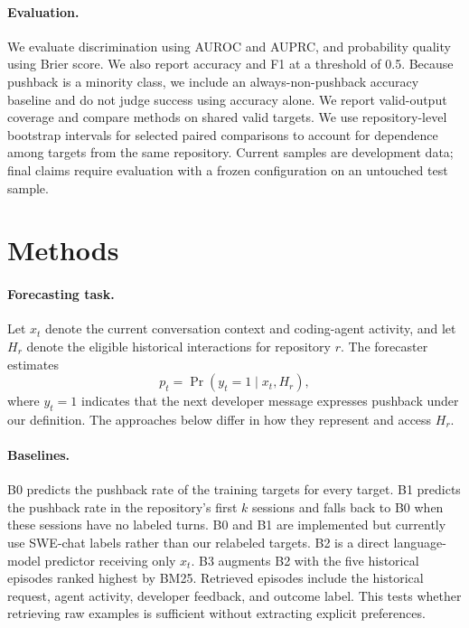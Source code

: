 \documentclass{article} %
\begin{document}
\paragraph{Evaluation.}
We evaluate discrimination using AUROC and AUPRC, and probability quality using Brier score. We also report accuracy and F1 at a threshold of 0.5. Because pushback is a minority class, we include an always-non-pushback accuracy baseline and do not judge success using accuracy alone. We report valid-output coverage and compare methods on shared valid targets. We use repository-level bootstrap intervals for selected paired comparisons to account for dependence among targets from the same repository. Current samples are development data; final claims require evaluation with a frozen configuration on an untouched test sample.

\section{Methods}

\paragraph{Forecasting task.}
Let $x_t$ denote the current conversation context and coding-agent activity, and let $H_r$ denote the eligible historical interactions for repository $r$. The forecaster estimates
\begin{equation}
p_t = \Pr(y_t = 1 \mid x_t, H_r),
\end{equation}
where $y_t=1$ indicates that the next developer message expresses pushback under our definition. The approaches below differ in how they represent and access $H_r$.

\paragraph{Baselines.}
B0 predicts the pushback rate of the training targets for every target. B1 predicts the pushback rate in the repository's first $k$ sessions and falls back to B0 when these sessions have no labeled turns. B0 and B1 are implemented but currently use SWE-chat labels rather than our relabeled targets. B2 is a direct language-model predictor receiving only $x_t$. B3 augments B2 with the five historical episodes ranked highest by BM25. Retrieved episodes include the historical request, agent activity, developer feedback, and outcome label. This tests whether retrieving raw examples is sufficient without extracting explicit preferences.
\end{document}

